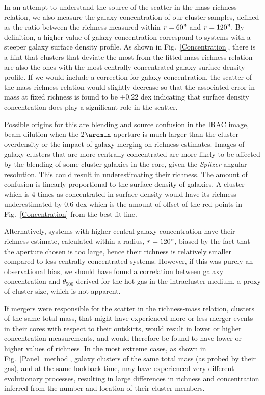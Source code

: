 \documentclass[apj,twocolumn]{emulateapj}
\begin{document}
{In an attempt to understand the source of the scatter in the mass-richness relation, we also measure the galaxy concentration of our cluster samples, defined as the ratio between the richness measured within $r= 60"$ and $r=120"$. By definition, a higher value of galaxy concentration correspond to systems with a steeper galaxy surface density profile.
As shown in Fig.~\ref{Concentration}, there is a hint that clusters that deviate the most from the fitted mass-richness relation are also the ones with the most centrally concentrated
galaxy surface density profile. 
If we would include a correction for galaxy concentration, the scatter of the mass-richness relation would slightly decrease so that the associated error in mass at fixed richness  is found to be $\pm 0.22$ dex
indicating that surface density concentration does play a significant role in the scatter.

Possible origins for this are blending and source confusion in the IRAC image, beam dilution when the 2$\arcmin$ aperture is much larger than the cluster overdensity
or the impact of galaxy merging on richness estimates.
Images of galaxy clusters that are more centrally concentrated are more likely to be affected by the blending of some cluster galaxies in the core, given the {\it Spitzer} angular resolution. This could result in underestimating their richness. The amount of confusion is linearly proportional to the surface density of galaxies. A cluster which is 4 times as concentrated in surface density would have its richness
underestimated by 0.6 dex which is the amount of offset of the red points in Fig.~\ref{Concentration} from the best fit line.

Alternatively, systems with higher central galaxy concentration have their richness estimate, calculated within a radius, $r=120"$, biased by the fact that the aperture chosen is too large, hence their richness is relatively smaller compared to less centrally concentrated systems. However, if this was purely an observational bias, we should have found a correlation between galaxy concentration and $\theta_{500}$ derived for the hot gas in the intracluster medium, a proxy of cluster size, which is not apparent.

If mergers were responsible for the scatter in the richness-mass relation, clusters of the same total mass, that might have experienced more or less merger events in their cores with respect to their outskirts, would result in lower or higher concentration measurements, and would therefore be found to have lower or higher values of richness. In the most extreme cases, as shown in Fig.~\ref{Panel_method}, galaxy clusters of the same total mass (as probed by their gas), and at the same lookback time, may have experienced very different  evolutionary processes, resulting in large differences in richness and concentration inferred from the number and location of their cluster members.

}
\end{document}
